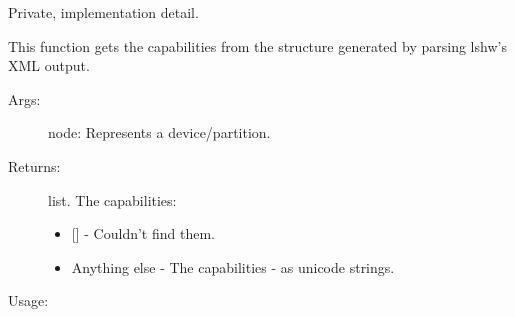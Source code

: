 \documentclass[letterpaper,10pt,english]{sphinxmanual}
\begin{document}
\begin{fulllineitems}
\label{\detokenize{linux:getdevinfo.linux.get_capabilities}}
Private, implementation detail.

This function gets the capabilities from the structure
generated by parsing lshw’s XML output.
\begin{description}
\item[{Args:}] \leavevmode
node:   Represents a device/partition.

\item[{Returns:}] \leavevmode
list. The capabilities:
\begin{itemize}
\item {} 
{[}{]}            - Couldn’t find them.

\item {} 
Anything else - The capabilities - as unicode strings.

\end{itemize}

\end{description}

Usage:

\begin{sphinxVerbatim}[commandchars=\\\{\}]
  
\end{sphinxVerbatim}

\end{fulllineitems}

\end{document}
